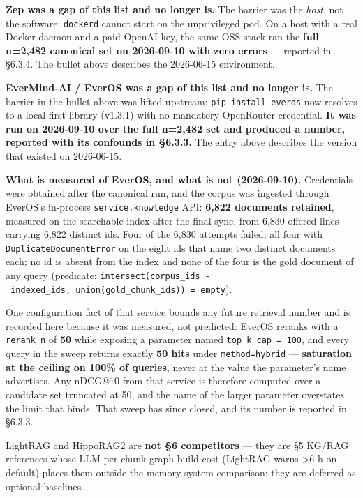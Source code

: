 \documentclass[
]{article}
\newcounter{none} %
\begin{document}
\textbf{Zep was a gap of this list and no longer is.} The barrier was
the \emph{host}, not the software: \texttt{dockerd} cannot start on the
unprivileged pod. On a host with a real Docker daemon and a paid OpenAI
key, the same OSS stack ran the \textbf{full n=2,482 canonical set on
2026-09-10 with zero errors} --- reported in §6.3.4. The bullet above
describes the 2026-06-15 environment.

\textbf{EverMind-AI / EverOS was a gap of this list and no longer is.}
The barrier in the bullet above was lifted upstream:
\texttt{pip\ install\ everos} now resolves to a local-first library
(v1.3.1) with no mandatory OpenRouter credential. \textbf{It was run on
2026-09-10 over the full n=2,482 set and produced a number, reported
with its confounds in §6.3.3.} The entry above describes the version
that existed on 2026-06-15.

\textbf{What is measured of EverOS, and what is not (2026-09-10).}
Credentials were obtained after the canonical run, and the corpus was
ingested through EverOS's in-process \texttt{service.knowledge} API:
\textbf{6,822 documents retained}, measured on the searchable index
after the final sync, from 6,830 offered lines carrying 6,822 distinct
ids. Four of the 6,830 attempts failed, all four with
\texttt{DuplicateDocumentError} on the eight ids that name two distinct
documents each; no id is absent from the index and none of the four is
the gold document of any query (predicate:
\texttt{intersect(corpus\_ids\ -\ indexed\_ids,\ union(gold\_chunk\_ids))\ =\ empty}).

One configuration fact of that service bounds any future retrieval
number and is recorded here because it was measured, not predicted:
EverOS reranks with a \texttt{rerank\_n} of \textbf{50} while exposing a
parameter named \texttt{top\_k\_cap\ =\ 100}, and every query in the
sweep returns exactly \textbf{50 hits} under \texttt{method=hybrid} ---
\textbf{saturation at the ceiling on 100\% of queries}, never at the
value the parameter's name advertises. Any nDCG@10 from that service is
therefore computed over a candidate set truncated at 50, and the name of
the larger parameter overstates the limit that binds. That sweep has
since closed, and its number is reported in §6.3.3.

LightRAG and HippoRAG2 are \textbf{not §6 competitors} --- they are §5
KG/RAG references whose LLM-per-chunk graph-build cost (LightRAG warns
\textgreater6 h on default) places them outside the memory-system
comparison; they are deferred as optional baselines.
\end{document}
